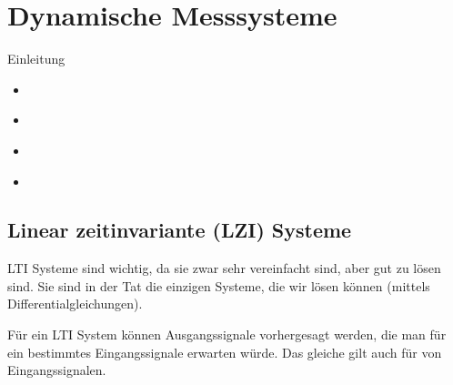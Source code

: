 \documentclass[letterpaper,10pt,english]{jupyterBook}
\begin{document}
\sphinxstepscope


\chapter{Dynamische Messsysteme}
\label{\detokenize{content/5_Dynamische_Messsysteme:dynamische-messsysteme}}\label{\detokenize{content/5_Dynamische_Messsysteme::doc}}
\sphinxAtStartPar
Einleitung
\begin{itemize}
\item {} 
\sphinxAtStartPar
{\hyperref[\detokenize{content/5_LTI::doc}]{}}

\item {} 
\sphinxAtStartPar
{\hyperref[\detokenize{content/5_DGL::doc}]{}}

\item {} 
\sphinxAtStartPar
{\hyperref[\detokenize{content/5_ImpulsSprung::doc}]{}}

\item {} 
\sphinxAtStartPar
{\hyperref[\detokenize{content/5_Uebertragungsfunktion::doc}]{}}

\end{itemize}

\sphinxstepscope


\section{Linear zeitinvariante (LZI) Systeme}
\label{\detokenize{content/5_LTI:linear-zeitinvariante-lzi-systeme}}\label{\detokenize{content/5_LTI::doc}}
\sphinxAtStartPar


\sphinxAtStartPar
LTI Systeme sind wichtig, da sie zwar sehr vereinfacht sind, aber gut zu lösen sind. Sie sind in der Tat die einzigen Systeme, die wir lösen können (mittels Differentialgleichungen).

\sphinxAtStartPar
Für ein LTI System können Ausgangssignale vorhergesagt werden, die man für ein bestimmtes Eingangssignale erwarten würde. Das gleiche gilt auch für  von Eingangssignalen.
\end{document}
